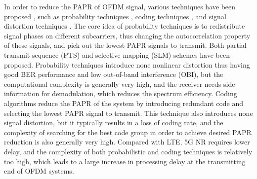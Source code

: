 \documentclass{ccjnl}
\begin{document}
In order to reduce the PAPR of OFDM signal, various techniques have been proposed \cite{5,6}, such as probability techniques \cite{7,8}, coding techniques \cite{9}, and signal distortion techniques \cite{10,11,12,13,14,15,16,17,18,19,20,21,22,23}. The core idea of probability techniques is to redistribute signal phases on different subcarriers, thus changing the autocorrelation property of these signals, and pick out the lowest PAPR signals to transmit. Both partial transmit sequence (PTS) \cite{7} and selective mapping (SLM) \cite{8} schemes have been proposed. Probability techniques introduce none nonlinear distortion thus having good BER performance and low out-of-band interference (OBI), but the computational complexity is generally very high, and the receiver needs side information for demodulation, which reduces the spectrum efficiency. Coding algorithms reduce the PAPR of the system by introducing redundant code and selecting the lowest PAPR signal to transmit. This technique also introduces none signal distortion, but it typically results in a loss of coding rate, and the complexity of searching for the best code group in order to achieve desired PAPR reduction is also generally very high. Compared with LTE, 5G NR requires lower delay, and the complexity of both probabilistic and coding techniques is relatively too high, which leads to a large increase in processing delay at the transmitting end of OFDM systems. 
\end{document}
